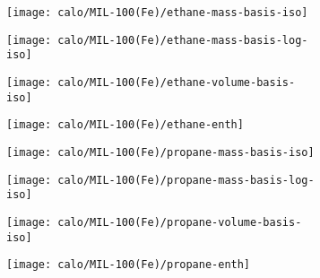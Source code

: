 \begin{figure}[H]

    \begin{subfigure}{0.25\textwidth}
        \texttt{[image: calo/MIL-100(Fe)/ethane-mass-basis-iso]}%
        \label{appx:fig:shaping:mil100c2h6mass}
    \end{subfigure}%
    \begin{subfigure}{0.25\textwidth}
        \texttt{[image: calo/MIL-100(Fe)/ethane-mass-basis-log-iso]}%
        \label{appx:fig:shaping:mil100c2h6masslog}
    \end{subfigure}%
    \begin{subfigure}{0.25\textwidth}
        \texttt{[image: calo/MIL-100(Fe)/ethane-volume-basis-iso]}%
        \label{appx:fig:shaping:mil100c2h6volume}
    \end{subfigure}%
    \begin{subfigure}{0.25\textwidth}
        \texttt{[image: calo/MIL-100(Fe)/ethane-enth]}%
        \label{appx:fig:shaping:mil100c2h6enth}
    \end{subfigure}%

    \begin{subfigure}{0.25\textwidth}
        \texttt{[image: calo/MIL-100(Fe)/propane-mass-basis-iso]}%
        \label{appx:fig:shaping:mil100c3h8mass}
    \end{subfigure}%
    \begin{subfigure}{0.25\textwidth}
        \texttt{[image: calo/MIL-100(Fe)/propane-mass-basis-log-iso]}%
        \label{appx:fig:shaping:mil100c3h8masslog}
    \end{subfigure}%
    \begin{subfigure}{0.25\textwidth}
        \texttt{[image: calo/MIL-100(Fe)/propane-volume-basis-iso]}%
        \label{appx:fig:shaping:mil100c3h8volume}
    \end{subfigure}%
    \begin{subfigure}{0.25\textwidth}
        \texttt{[image: calo/MIL-100(Fe)/propane-enth]}%
        \label{appx:fig:shaping:mil100c3h8enth}
    \end{subfigure}%


\end{figure}
